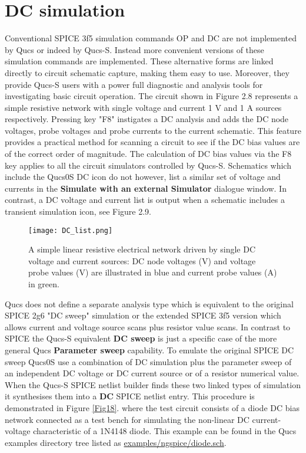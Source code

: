 \section{DC simulation}
Conventional SPICE 3f5 simulation commands OP and DC are not implemented by Qucs or indeed by Qucs-S. Instead more convenient versions of these simulation commands are implemented.  These alternative forms are linked directly to circuit schematic capture, making them easy to use.  Moreover, they provide Qucs-S users with a power full diagnostic and analysis tools for investigating basic circuit operation. The circuit shown in Figure 2.8 represents a simple resistive network with single voltage and current 1 V and 1 A sources respectively. Pressing key "F8" instigates a DC analysis and adds the DC node voltages, probe voltages and probe currents to the current schematic. This feature provides a practical method for scanning a circuit to see if the DC bias values are of the correct order of magnitude. The calculation of DC bias values via the F8 key applies to all the circuit simulators controlled by Qucs-S. Schematics which include the Qucs0S DC icon do not however, list a similar set of voltage and currents in the \textbf{Simulate with an external Simulator} dialogue window. In contrast, a DC voltage and current list is output when a schematic includes a transient simulation icon, see Figure 2.9.
 \begin{figure}[h]
	\centering
	\texttt{[image: DC\_list.png]}
	\caption{A simple linear resistive electrical network driven by single DC voltage and current sources: DC node voltages (V) and voltage probe values (V) are illustrated in blue and current probe values (A) in green.}
	\label{Fig16}
\end{figure}
Qucs does not define a separate analysis type which is equivalent to the original SPICE 2g6 "DC sweep" simulation or the extended SPICE 3f5 version which allows current and voltage source scans plus resistor value scans.  In contrast to SPICE the  Qucs-S equivalent \textbf{DC sweep} is just a specific case of the more general Qucs \textbf{Parameter sweep} capability. To emulate the original SPICE DC sweep Qucs0S use a combination of  DC simulation plus the parameter sweep of an independent DC voltage or DC current source or of a resistor numerical value. When the Qucs-S SPICE netlist builder finds these two linked types of simulation it synthesises them into a \textbf{DC} SPICE netlist entry.  This procedure is demonstrated in Figure \ref{Fig18}. where  the test circuit consists of a diode DC bias network connected as a test bench for simulating the non-linear DC current-voltage characteristic of a 1N4148 diode. This example can be found in the Qucs examples directory tree  listed as \url{examples/ngspice/diode.sch}.




